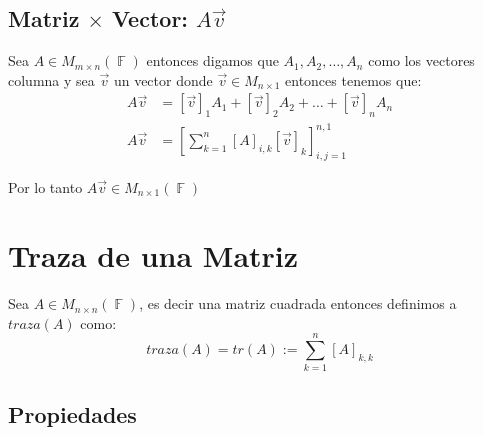 \documentclass[12pt, fleqn]{report}                             %
\theoremstyle{break}                                            %
\DeclareMathOperator \GenericField {\mathbb{F}}                 %
\newcommand{\Brackets}[1]       {\left[ #1 \right]}             %
\begin{document}
            \clearpage
            \subsection{Matriz $\times$ Vector: $A\vec{v}$}
                
                Sea $A \in M_{m \times n}(\GenericField)$ entonces digamos que $A_1, A_2, \dots, A_n$
                como los vectores columna y sea $\vec{v}$ un vector donde $\vec{v} \in M_{n \times 1}$
                entonces tenemos que:
                \begin{align*}
                    A\vec{v} &= [\vec{v}]_1 A_1 + [\vec{v}]_2 A_2 + \dots + [\vec{v}]_n A_n             \\
                    A\vec{v} &= \Brackets{ \sum_{k=1}^{n} [A]_{i, k} [\vec{v}]_k }_{i, j = 1}^{n, 1}
                \end{align*}

                Por lo tanto $A\vec{v} \in M_{n \times 1}(\GenericField)$



        \clearpage
        \section{Traza de una Matriz}

            Sea $A \in M_{n \times n}(\GenericField)$, es decir una matriz cuadrada entonces
            definimos a $traza(A)$ como:
            \begin{equation*}
                traza(A) 
                    = tr(A)
                    := \sum_{k = 1}^n [A]_{k, k}
            \end{equation*}


            \subsection{Propiedades}
\end{document}
